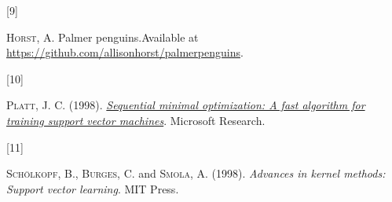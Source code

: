 \documentclass[
  11pt,
  letterpaper,
]{scrbook}
\newlength{\cslhangindent}
\newlength{\csllabelwidth}
\newlength{\cslentryspacingunit} %
\newenvironment{CSLReferences}[2] %
 {%
  \setlength{\parindent}{0pt}
  \ifodd #1
  \let\oldpar\par
  \def\par{\hangindent=\cslhangindent\oldpar}
  \fi
  \setlength{\parskip}{#2\cslentryspacingunit}
 }%
 {}
\newcommand{\CSLLeftMargin}[1]{\parbox[t]{\csllabelwidth}{#1}}
\newcommand{\CSLRightInline}[1]{\parbox[t]{\linewidth - \csllabelwidth}{#1}\break}
\theoremstyle{plain}
\theoremstyle{plain}
\theoremstyle{remark}
\begin{document}
\begin{CSLReferences}{0}{0}
\leavevmode{}%
\CSLLeftMargin{{[}9{]} }%
\CSLRightInline{\textsc{Horst}, A. Palmer penguins.Available at
\url{https://github.com/allisonhorst/palmerpenguins}.}

\leavevmode{}%
\CSLLeftMargin{{[}10{]} }%
\CSLRightInline{\textsc{Platt}, J. C. (1998).
\emph{\href{https://www-ai.cs.tu-dortmund.de/LEHRE/SEMINARE/SS09/AKTARBEITENDESDM/LITERATUR/PlattSMO.pdf}{Sequential
minimal optimization: A fast algorithm for training support vector
machines}}. Microsoft Research.}

\leavevmode{}%
\CSLLeftMargin{{[}11{]} }%
\CSLRightInline{\textsc{Schölkopf}, B., \textsc{Burges}, C. and
\textsc{Smola}, A. (1998). \emph{Advances in kernel methods: Support
vector learning}. MIT Press.}

\end{CSLReferences}


\backmatter
\end{document}
